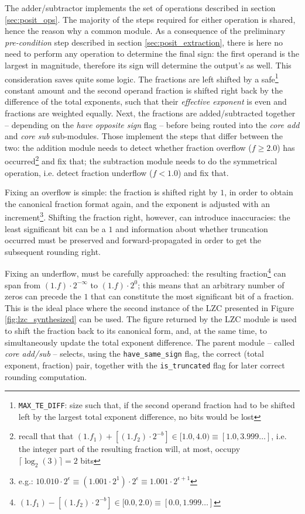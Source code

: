 The adder/subtractor implements the set of operations described in section \ref{sec:posit_ops}. The majority of the steps required for either operation is shared, hence the reason why a common module.
As a consequence of the preliminary \textit{pre-condition} step described in section \ref{sec:posit_extraction}, there is here no need to perform any operation to determine the final sign: the first operand is the largest in magnitude, therefore its sign will determine the output's as well. This consideration saves quite some logic.
The fractions are left shifted by a safe\footnote{\texttt{MAX\_TE\_DIFF}: size such that, if the second operand fraction had to be shifted left by the largest total exponent difference, no bits would be lost} constant amount and the second operand fraction is shifted right back by the difference of the total exponents, such that their \textit{effective exponent} is even and fractions are weighted equally.
Next, the fractions are added/subtracted together -- depending on the \textit{have opposite sign} flag -- before being routed into the \textit{core add} and \textit{core sub} sub-modules. Those implement the steps that differ between the two: the addition module needs to detect whether fraction overflow ($f \ge 2.0$) has occurred\footnote{recall that  that $(1.f_1) + [(1.f_2) \cdot 2^{-b}] \in [1.0, 4.0) \equiv [1.0, 3.999\dots]$, i.e. the integer part of the resulting fraction will, at most, occupy $\lceil\log_2(3)\rceil = 2$ bits} and fix that; the subtraction module needs to do the symmetrical operation, i.e. detect fraction underflow ($f < 1.0$) and fix that.

Fixing an overflow is simple: the fraction is shifted right by $1$, in order to obtain the canonical fraction format again, and the exponent is adjusted with an increment\footnote{e.g.: $10.010 \cdot 2^{\epsilon} \equiv (1.001 \cdot 2^1) \cdot 2^{\epsilon} \equiv 1.001 \cdot 2^{\epsilon + 1}$}. Shifting the fraction right, however, can introduce inaccuracies: the least significant bit can be a $1$ and information about whether truncation occurred must be preserved and forward-propagated in order to get the subsequent rounding right.

Fixing an underflow, must be carefully approached:
the resulting fraction\footnote{$(1.f_1) - [(1.f_2) \cdot 2^{-b}] \in [0.0, 2.0) \equiv [0.0, 1.999\dots]$} can span from
$(1.f) \cdot 2^{-\infty}$ to $(1.f) \cdot 2^{0}$; this means that an arbitrary number of zeros can precede the $1$ that can constitute the most significant bit of a fraction.
This is the ideal place where the second instance of the LZC presented in Figure \ref{fig:lzc_synthesized} can be used.
The figure returned by the LZC module is used to shift the fraction back to its canonical form, and, at the same time, to simultaneously update the total exponent difference.
The parent module -- called \textit{core add/sub} -- selects, using the \texttt{have\_same\_sign} flag, the correct (total exponent, fraction) pair, together with the \texttt{is\_truncated} flag for later correct rounding computation.

